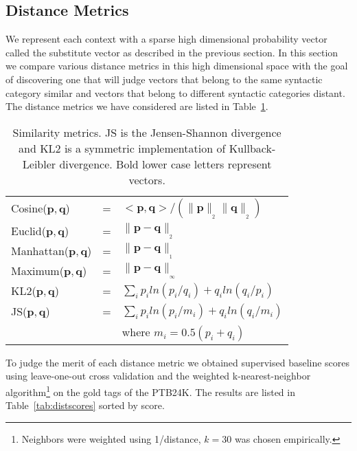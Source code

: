 \subsection{Distance Metrics}
\label{sec:dist}

We represent each context with a sparse high dimensional probability
vector called the substitute vector as described in the previous
section.  In this section we compare various distance metrics in this
high dimensional space with the goal of discovering one that will
judge vectors that belong to the same syntactic category similar and
vectors that belong to different syntactic categories distant.  The
distance metrics we have considered are listed in
Table~\ref{tab:metrics}.


\begin{table}[ht] \centering
\caption{Similarity metrics.  JS is the Jensen-Shannon divergence and
  KL2 is a symmetric implementation of Kullback-Leibler
  divergence. Bold lower case letters represent vectors.}
\begin{tabular}{|lll|}
\hline
Cosine($\mathbf{p}, \mathbf{q}$) & = & $<\mathbf{p},\mathbf{q}> / (\|\mathbf{p}\|_{_{2}} \|\mathbf{q}\|_{_{2}})$ \\
Euclid($\mathbf{p}, \mathbf{q}$) & = & $\|\mathbf{p} - \mathbf{q}\|_{_{2}}$ \\
Manhattan($\mathbf{p}, \mathbf{q}$) & = & $\|\mathbf{p} - \mathbf{q}\|_{_{1}}$ \\
Maximum($\mathbf{p}, \mathbf{q}$) & = & $\|\mathbf{p} - \mathbf{q}\|_{_{\infty}}$ \\
KL2($\mathbf{p}, \mathbf{q}$) & = & $\sum_i p_iln(p_i/q_i) + q_iln(q_i/p_i) $\\
JS($\mathbf{p}, \mathbf{q}$) & = & $\sum_i p_iln(p_i/m_i) + q_iln(q_i/m_i) $\\
& & where $m_i = 0.5(p_i + q_i)$\\
\hline
\end{tabular}
\label{tab:metrics}
\end{table}

To judge the merit of each distance metric we obtained supervised
baseline scores using leave-one-out cross validation and the weighted
k-nearest-neighbor algorithm\footnote{Neighbors were weighted using
  1/distance, $k=30$ was chosen empirically.} on the gold tags of the
PTB24K.  The results are listed in
Table~\ref{tab:distscores} sorted by score.

